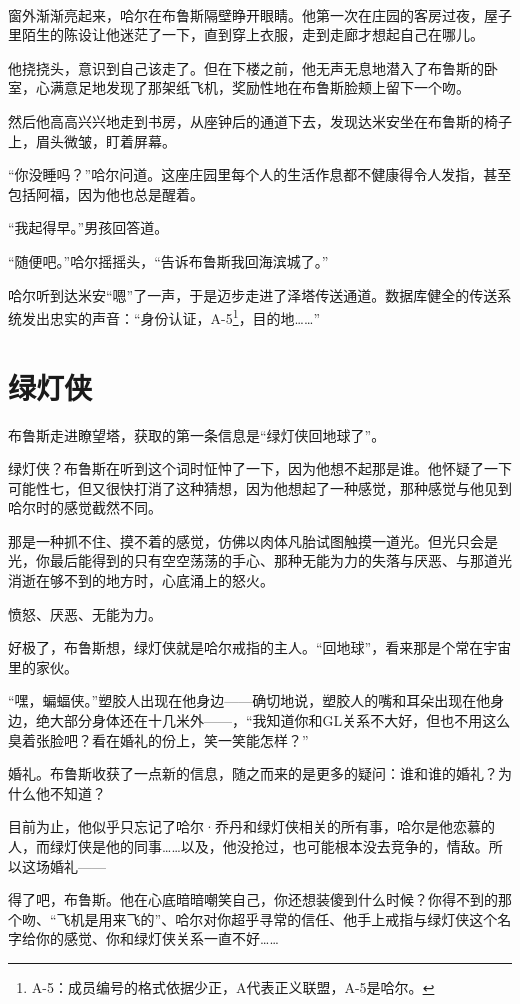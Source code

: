 \documentclass[../main.tex]{subfiles}
\begin{document}
~\

窗外渐渐亮起来，哈尔在布鲁斯隔壁睁开眼睛。他第一次在庄园的客房过夜，屋子里陌生的陈设让他迷茫了一下，直到穿上衣服，走到走廊才想起自己在哪儿。

他挠挠头，意识到自己该走了。但在下楼之前，他无声无息地潜入了布鲁斯的卧室，心满意足地发现了那架纸飞机，奖励性地在布鲁斯脸颊上留下一个吻。

然后他高高兴兴地走到书房，从座钟后的通道下去，发现达米安坐在布鲁斯的椅子上，眉头微皱，盯着屏幕。

“你没睡吗？”哈尔问道。这座庄园里每个人的生活作息都不健康得令人发指，甚至包括阿福，因为他也总是醒着。

“我起得早。”男孩回答道。

“随便吧。”哈尔摇摇头，“告诉布鲁斯我回海滨城了。”

哈尔听到达米安“嗯”了一声，于是迈步走进了泽塔传送通道。数据库健全的传送系统发出忠实的声音：“身份认证，A-5\footnote[1]{A-5：成员编号的格式依据少正，A代表正义联盟，A-5是哈尔。}，目的地……”

\section{绿灯侠}

布鲁斯走进瞭望塔，获取的第一条信息是“绿灯侠回地球了”。

绿灯侠？布鲁斯在听到这个词时怔忡了一下，因为他想不起那是谁。他怀疑了一下可能性七，但又很快打消了这种猜想，因为他想起了一种感觉，那种感觉与他见到哈尔时的感觉截然不同。

那是一种抓不住、摸不着的感觉，仿佛以肉体凡胎试图触摸一道光。但光只会是光，你最后能得到的只有空空荡荡的手心、那种无能为力的失落与厌恶、与那道光消逝在够不到的地方时，心底涌上的怒火。

愤怒、厌恶、无能为力。

好极了，布鲁斯想，绿灯侠就是哈尔戒指的主人。“回地球”，看来那是个常在宇宙里的家伙。

“嘿，蝙蝠侠。”塑胶人出现在他身边——确切地说，塑胶人的嘴和耳朵出现在他身边，绝大部分身体还在十几米外——，“我知道你和GL关系不大好，但也不用这么臭着张脸吧？看在婚礼的份上，笑一笑能怎样？”

婚礼。布鲁斯收获了一点新的信息，随之而来的是更多的疑问：谁和谁的婚礼？为什么他不知道？

目前为止，他似乎只忘记了哈尔·乔丹和绿灯侠相关的所有事，哈尔是他恋慕的人，而绿灯侠是他的同事……以及，他没抢过，也可能根本没去竞争的，情敌。所以这场婚礼——

得了吧，布鲁斯。他在心底暗暗嘲笑自己，你还想装傻到什么时候？你得不到的那个吻、“飞机是用来飞的”、哈尔对你超乎寻常的信任、他手上戒指与绿灯侠这个名字给你的感觉、你和绿灯侠关系一直不好……
\end{document}
